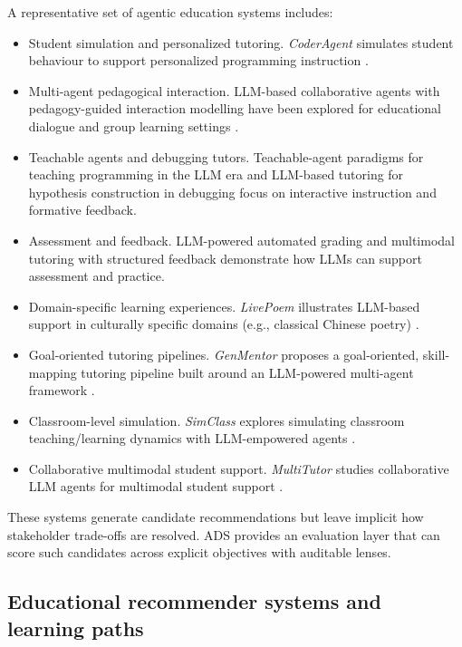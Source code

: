 \documentclass[sigconf,review]{acmart}
\begin{document}
A representative set of agentic education systems includes:
\begin{itemize}
    \item {Student simulation and personalized tutoring.} \emph{CoderAgent} simulates student behaviour to support personalized programming instruction \cite{coderagent2025}.
    \item {Multi-agent pedagogical interaction.} LLM-based collaborative agents with pedagogy-guided interaction modelling have been explored for educational dialogue and group learning settings \cite{collabAgents2025}.
    \item {Teachable agents and debugging tutors.} Teachable-agent paradigms for teaching programming in the LLM era \cite{teachProg2025} and LLM-based tutoring for hypothesis construction in debugging \cite{ma2023hypocompass} focus on interactive instruction and formative feedback.
    \item {Assessment and feedback.} LLM-powered automated grading \cite{llmGrading2025} and multimodal tutoring with structured feedback \cite{handByHand2025} demonstrate how LLMs can support assessment and practice.
    \item {Domain-specific learning experiences.} \emph{LivePoem} illustrates LLM-based support in culturally specific domains (e.g., classical Chinese poetry) \cite{livepoem2025}.
    \item {Goal-oriented tutoring pipelines.} \emph{GenMentor} proposes a goal-oriented, skill-mapping tutoring pipeline built around an LLM-powered multi-agent framework \cite{wang2025genmentor}.
    \item {Classroom-level simulation.} \emph{SimClass} explores simulating classroom teaching/learning dynamics with LLM-empowered agents \cite{zhang2024simclass}.
    \item {Collaborative multimodal student support.} \emph{MultiTutor} studies collaborative LLM agents for multimodal student support \cite{sun2025multitutor}.
\end{itemize}

\noindent
These systems generate candidate recommendations but leave implicit how stakeholder trade-offs are resolved. ADS provides an evaluation layer that can score such candidates across explicit objectives with auditable lenses.

\subsection{Educational recommender systems and learning paths}
\label{sec:rw-ers}
\end{document}
